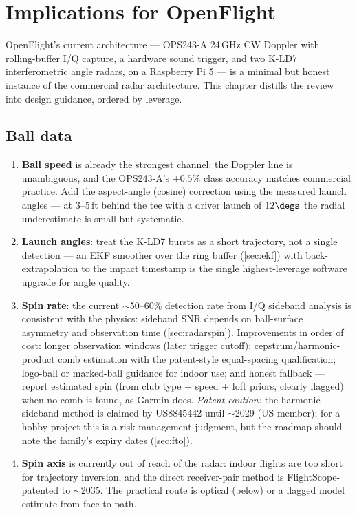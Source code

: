 \chapter{Implications for OpenFlight}
\label{ch:implications}

OpenFlight's current architecture --- OPS243-A 24\,GHz CW Doppler with
rolling-buffer I/Q capture, a hardware sound trigger, and two K-LD7
interferometric angle radars, on a Raspberry Pi 5 --- is a minimal but
honest instance of the commercial radar architecture. This chapter
distills the review into design guidance, ordered by leverage.

\section{Ball data}

\begin{enumerate}
\item \textbf{Ball speed} is already the strongest channel: the Doppler
line is unambiguous, and the OPS243-A's $\pm0.5\%$ class accuracy matches
commercial practice. Add the aspect-angle (cosine) correction using the
measured launch angles --- at 3--5\,ft behind the tee with a driver launch
of $12\degs$ the radial underestimate is small but systematic.
\item \textbf{Launch angles}: treat the K-LD7 bursts as a short
trajectory, not a single detection --- an EKF smoother over the ring
buffer (\cref{sec:ekf}) with back-extrapolation to the impact timestamp
is the single highest-leverage software upgrade for angle quality.
\item \textbf{Spin rate}: the current $\sim$50--60\% detection rate from
I/Q sideband analysis is consistent with the physics: sideband SNR
depends on ball-surface asymmetry and observation time
(\cref{sec:radarspin}). Improvements in order of cost: longer
observation windows (later trigger cutoff); cepstrum/harmonic-product
comb estimation with the patent-style equal-spacing qualification;
logo-ball or marked-ball guidance for indoor use; and honest fallback ---
report estimated spin (from club type + speed + loft priors, clearly
flagged) when no comb is found, as Garmin does. \emph{Patent caution:}
the harmonic-sideband method is claimed by US8845442 until $\sim$2029
(US member); for a hobby project this is a risk-management judgment, but
the roadmap should note the family's expiry dates
(\cref{sec:fto}).
\item \textbf{Spin axis} is currently out of reach of the radar: indoor
flights are too short for trajectory inversion, and the direct
receiver-pair method is FlightScope-patented to $\sim$2035. The practical
route is optical (below) or a flagged model estimate from face-to-path.
\end{enumerate}

